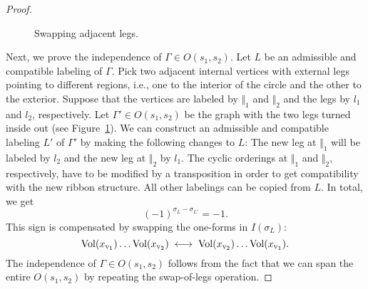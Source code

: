 \documentclass[\MainFolder/Text.tex]{subfiles}
\begin{document}
\begin{proof}
\begin{figure}[t]
\centering

\caption[Swap of adjacent vertices on a circular graph.]{Swapping adjacent legs.}\label{Fig:TwoLegs}
\end{figure}

Next, we prove the independence of $\Gamma\in O(s_1,s_2)$. Let $L$ be an admissible and compatible labeling of $\Gamma$. Pick two adjacent internal vertices with external legs pointing to different regions, i.e., one to the interior of the circle and the other to the exterior. Suppose that the vertices are labeled by $\Vert_1$ and $\Vert_2$ and the legs by $l_1$ and $l_2$, respectively. Let $\Gamma'\in O(s_1,s_2)$ be the graph with the two legs turned inside out (see Figure~\ref{Fig:TwoLegs}). We can construct an admissible and compatible labeling $L'$ of $\Gamma'$ by making the following changes to $L$: The new leg at $\Vert_1$ will be labeled by $l_2$ and the new leg at $\Vert_2$ by $l_1$.
The cyclic orderings at $\Vert_1$ and $\Vert_2$, respectively, have to be modified by a transposition in order to get compatibility with the new ribbon structure. All other labelings can be copied from $L$.
In total, we get
\[ (-1)^{\sigma_L - \sigma_{L'}} = -1. \]
This sign is compensated by swapping the one-forms in $I(\sigma_L)$:
\[ \mathrm{Vol} (x_{\mathrm{v}_1}) \dots \mathrm{Vol}(x_{\mathrm{v}_2}) \;\longleftrightarrow\;\mathrm{Vol}(x_{\mathrm{v}_2}) \dots \mathrm{Vol}(x_{\mathrm{v}_1}). \]
The independence of $\Gamma\in O(s_1,s_2)$ follows from the fact that we can span the entire $O(s_1,s_2)$ by repeating the swap-of-legs operation.
\end{proof}
\end{document}
